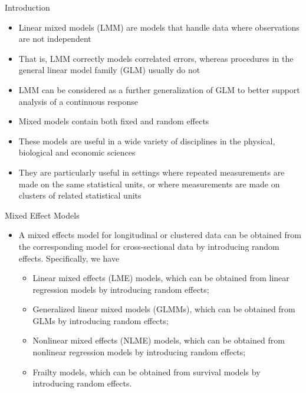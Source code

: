 \documentclass{beamer}
\begin{document}
\begin{frame}{Introduction}
\begin{itemize}
\item Linear mixed models (LMM) are models that handle data where observations are not independent
\item That is, LMM correctly models correlated errors, whereas procedures in the general linear model family (GLM) usually do not
\item LMM can be considered as a further generalization of GLM to better support analysis of a continuous response
\item Mixed models contain both fixed and random effects
\item These models are useful in a wide variety of disciplines in the physical, biological and economic sciences
\item They are particularly useful in settings where repeated measurements are made on the same statistical units, or where measurements are made on clusters of related statistical units
\end{itemize}
\end{frame}

\begin{frame}{Mixed Effect Models}
\begin{itemize}
\item A mixed effects model for longitudinal or clustered data can be obtained from the corresponding model for cross-sectional data by introducing random effects. Specifically, we have
\vspace*{2mm}
\begin{itemize}
\item Linear mixed effects (LME) models, which can be obtained from linear regression models by introducing random effects;
\vspace{0.5cm}
\item Generalized linear mixed models (GLMMs), which can be obtained from GLMs by introducing random effects;
\vspace{0.5cm}
\vspace{0.5cm}
\item Nonlinear mixed effects (NLME) models, which can be obtained from nonlinear regression models by introducing random effects;
\item  Frailty models, which can be obtained from survival models by introducing random effects.
\end{itemize}
\end{itemize}
\end{frame}
\end{document}
